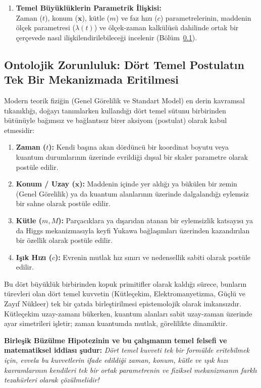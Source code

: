 \begin{enumerate}
      \item \textbf{Temel Büyüklüklerin Parametrik İlişkisi:} \\
            Zaman ($t$), konum ($\mathbf{x}$), kütle ($m$) ve faz hızı ($c$) parametrelerinin, maddenin ölçek parametresi ($\lambda(t)$) ve ölçek-zaman kalkülüsü dahilinde ortak bir çerçevede nasıl ilişkilendirilebileceği incelenir (Bölüm~\ref{sec:ontolojik_indirgeme}).
\end{enumerate}

\subsection{Ontolojik Zorunluluk: Dört Temel Postulatın Tek Bir Mekanizmada Eritilmesi}
\label{sec:ontolojik_indirgeme}

Modern teorik fiziğin (Genel Görelilik ve Standart Model) en derin kavramsal tıkanıklığı, doğayı tanımlarken kullandığı dört temel sütunu birbirinden bütünüyle bağımsız ve bağlantısız birer aksiyom (postulat) olarak kabul etmesidir:
\begin{enumerate}
      \item \textbf{Zaman ($t$):} Kendi başına akan dördüncü bir koordinat boyutu veya kuantum durumlarının üzerinde evrildiği dışsal bir skaler parametre olarak postüle edilir.
      \item \textbf{Konum / Uzay ($\mathbf{x}$):} Maddenin içinde yer aldığı ya bükülen bir zemin (Genel Görelilik) ya da kuantum alanlarının üzerinde dalgalandığı eylemsiz bir sahne olarak postüle edilir.
      \item \textbf{Kütle ($m, M$):} Parçacıklara ya dışarıdan atanan bir eylemsizlik katsayısı ya da Higgs mekanizmasıyla keyfi Yukawa bağlaşımları üzerinden kazandırılan bir özellik olarak postüle edilir.
      \item \textbf{Işık Hızı ($c$):} Evrenin mutlak hız sınırı ve nedensellik sabiti olarak postüle edilir.
\end{enumerate}

Bu dört büyüklük birbirinden kopuk primitifler olarak kaldığı sürece, bunların türevleri olan dört temel kuvvetin (Kütleçekim, Elektromanyetizma, Güçlü ve Zayıf Nükleer) tek bir çatıda birleştirilmesi epistemolojik olarak imkansızdır. Kütleçekim uzay-zamanı bükerken, kuantum alanları sabit uzay-zaman üzerinde ayar simetrileri işletir; zaman kuantumda mutlak, görelilikte dinamiktir.

\textbf{Birleşik Büzülme Hipotezinin ve bu çalışmanın temel felsefi ve matematiksel iddiası şudur:}
\textit{Dört temel kuvveti tek bir formülde eritebilmek için, evvela bu kuvvetlerin ifade edildiği zaman, konum, kütle ve ışık hızı kavramlarının kendileri tek bir ortak parametrenin ve fiziksel mekanizmanın farklı tezahürleri olarak çözülmelidir!}


